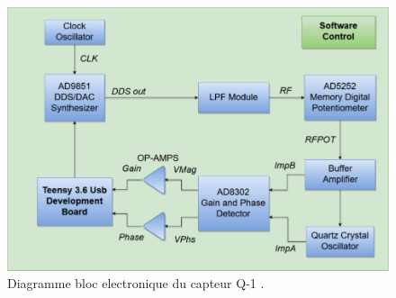\begin{figure}[H]
    \centering
    \includegraphics[width=\textwidth]{assets/figures/electronic block diagram QCM.png}
    \caption{Diagramme bloc electronique du capteur Q-1 \cite{manual-openqcmQ1}.}
    \label{fig:bloc diagram Q-1}
\end{figure}

